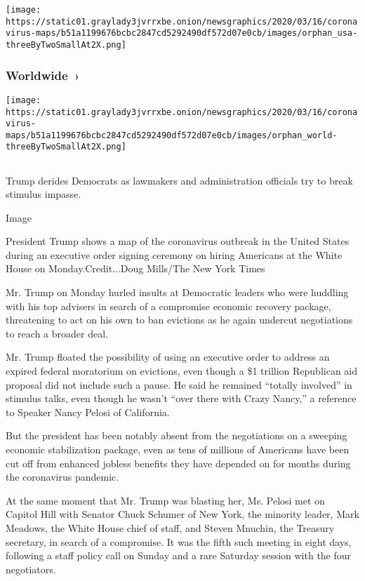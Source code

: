 \texttt{[image: https://static01.graylady3jvrrxbe.onion/newsgraphics/2020/03/16/coronavirus-maps/b51a1199676bcbc2847cd5292490df572d07e0cb/images/orphan\_usa-threeByTwoSmallAt2X.png]}

\href{https://www.nytimes3xbfgragh.onion/interactive/2020/world/coronavirus-maps.html}{}

\hypertarget{worldwide-}{%
\subsubsection{Worldwide~›}\label{worldwide-}}

\texttt{[image: https://static01.graylady3jvrrxbe.onion/newsgraphics/2020/03/16/coronavirus-maps/b51a1199676bcbc2847cd5292490df572d07e0cb/images/orphan\_world-threeByTwoSmallAt2X.png]}

\hypertarget{-1}{%
\subsection{}\label{-1}}

Trump derides Democrats as lawmakers and administration officials try to
break stimulus impasse.

Image

President Trump shows a map of the coronavirus outbreak in the United
States during an executive order signing ceremony on hiring Americans at
the White House on Monday.Credit...Doug Mills/The New York Times

Mr. Trump on Monday hurled insults at Democratic leaders who were
huddling with his top advisers in search of a compromise economic
recovery package, threatening to act on his own to ban evictions as he
again undercut negotiations to reach a broader deal.

Mr. Trump floated the possibility of using an executive order to address
an expired federal moratorium on evictions, even though a \$1 trillion
Republican aid proposal did not include such a pause. He said he
remained ``totally involved'' in stimulus talks, even though he wasn't
``over there with Crazy Nancy,'' a reference to Speaker Nancy Pelosi of
California.

But the president has been notably absent from the negotiations on a
sweeping economic stabilization package, even as tens of millions of
Americans have been cut off from enhanced jobless benefits they have
depended on for months during the coronavirus pandemic.

At the same moment that Mr. Trump was blasting her, Ms. Pelosi met on
Capitol Hill with Senator Chuck Schumer of New York, the minority
leader, Mark Meadows, the White House chief of staff, and Steven
Mnuchin, the Treasury secretary, in search of a compromise. It was the
fifth such meeting in eight days, following a staff policy call on
Sunday and a rare Saturday session with the four negotiators.


